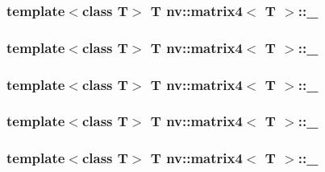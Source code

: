 \hypertarget{classnv_1_1matrix4_bfd2c00d09f2c94359fa75e034a9d365}{
\subsubsection[{\_\-21}]{\setlength{\rightskip}{0pt plus 5cm}template$<$class T$>$ T {\bf nv::matrix4}$<$ T $>$::{\bf \_}}}
\label{classnv_1_1matrix4_bfd2c00d09f2c94359fa75e034a9d365}


\hypertarget{classnv_1_1matrix4_236e012222dca1ae40ca9de68b6890d1}{
\subsubsection[{\_\-22}]{\setlength{\rightskip}{0pt plus 5cm}template$<$class T$>$ T {\bf nv::matrix4}$<$ T $>$::{\bf \_}}}
\label{classnv_1_1matrix4_236e012222dca1ae40ca9de68b6890d1}


\hypertarget{classnv_1_1matrix4_4e2177512a4e3ea9b6d8584ce73ce724}{
\subsubsection[{\_\-23}]{\setlength{\rightskip}{0pt plus 5cm}template$<$class T$>$ T {\bf nv::matrix4}$<$ T $>$::{\bf \_}}}
\label{classnv_1_1matrix4_4e2177512a4e3ea9b6d8584ce73ce724}


\hypertarget{classnv_1_1matrix4_7bd4413efb39c6cfb52e24e1019ecedc}{
\subsubsection[{\_\-24}]{\setlength{\rightskip}{0pt plus 5cm}template$<$class T$>$ T {\bf nv::matrix4}$<$ T $>$::{\bf \_}}}
\label{classnv_1_1matrix4_7bd4413efb39c6cfb52e24e1019ecedc}


\hypertarget{classnv_1_1matrix4_585382c55b5ba7921a7c55d0b51fdeb2}{
\subsubsection[{\_\-31}]{\setlength{\rightskip}{0pt plus 5cm}template$<$class T$>$ T {\bf nv::matrix4}$<$ T $>$::{\bf \_}}}
\label{classnv_1_1matrix4_585382c55b5ba7921a7c55d0b51fdeb2}


